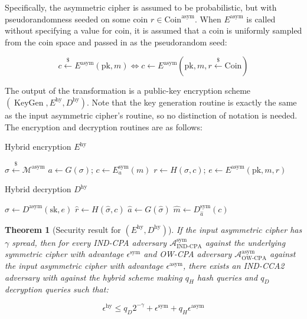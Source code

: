 \documentclass{article}
\newcommand{\leftsample}{\overset{{\scriptscriptstyle\$}}{\leftarrow}}
\newtheorem{theorem}{Theorem}[section]
\begin{document}
Specifically, the asymmetric cipher is assumed to be probabilistic, but with pseudorandomness seeded on some coin $r \in \text{Coin}^\text{asym}$. When $E^\text{asym}$ is called without specifying a value for coin, it is assumed that a coin is uniformly sampled from the coin space and passed in as the pseudorandom seed:

$$
    c \leftsample E^\text{asym}(\text{pk}, m) 
    \Leftrightarrow 
    c \leftarrow E^\text{asym}(\text{pk}, m, r \leftsample \text{Coin})
$$

The output of the transformation is a public-key encryption scheme $(\operatorname{KeyGen}, E^\text{hy}, D^\text{hy})$. Note that the key generation routine is exactly the same as the input asymmetric cipher's routine, so no distinction of notation is needed. The encryption and decryption routines are as follows:

\begin{multicols}{2}
    \begin{algorithm}[H]
        \SetAlgoLined
        \caption{Hybrid encryption $E^\text{hy}$}
        $\sigma \leftsample \mathcal{M}^\text{asym}$\;
        $a \leftarrow G(\sigma)$; $c \leftarrow E^\text{sym}_a(m)$\;
        $r \leftarrow H(\sigma, c)$;
        $e \leftarrow E^\text{asym}(\text{pk}, m, r)$\;
        \;
    \end{algorithm}

    \columnbreak

    \begin{algorithm}[H]\label{hybrid-decryption-99}
        \SetAlgoLined
        \caption{Hybrid decryption $D^\text{hy}$}
        $\hat{\sigma} \leftarrow D^\text{asym}(\text{sk}, e)$\;
        $\hat{r} \leftarrow H(\hat{\sigma}, c)$\;
        $\hat{a} \leftarrow G(\hat{\sigma})$\;
        $\hat{m} \leftarrow D^\text{sym}_{\hat{a}}(c)$\;
        \;
    \end{algorithm}
\end{multicols}

\begin{theorem}[Security result for $(E^\text{hy}, D^\text{hy})$]\label{fo-1999-theorem}
    If the input asymmetric cipher has $\gamma$ spread, then for every IND-CPA adversary $\mathcal{A}^\text{sym}_\text{IND-CPA}$ against the underlying symmetric cipher with advantage $\epsilon^\text{sym}$ and OW-CPA adversary $\mathcal{A}^\text{asym}_\text{OW-CPA}$ against the input asymmetric cipher with advantage $\epsilon^\text{asym}$, there exists an IND-CCA2 adversary with against the hybrid scheme making $q_H$ hash queries and $q_D$ decryption queries such that:

    \begin{equation*}
        \epsilon^\text{hy} 
        \leq q_D2^{-\gamma} 
            + \epsilon^\text{sym} 
            + q_H\epsilon^\text{asym}
    \end{equation*}
\end{theorem}
\end{document}
